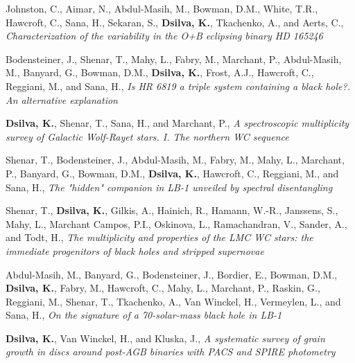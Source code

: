 \begin{enumerate}
Johnston, C., Aimar, N., Abdul-Masih, M., Bowman, D.M., White, T.R., Hawcroft, C., Sana, H., Sekaran, S., \textbf{Dsilva, K.}, Tkachenko, A., and Aerts, C., \textit{Characterization of the variability in the O+B eclipsing binary HD 165246}

Bodensteiner, J., Shenar, T., Mahy, L., Fabry, M., Marchant, P., Abdul-Masih, M., Banyard, G., Bowman, D.M., \textbf{Dsilva, K.}, Frost, A.J., Hawcroft, C., Reggiani, M., and Sana, H., \textit{Is HR 6819 a triple system containing a black hole?. An alternative explanation}

\textbf{Dsilva, K.}, Shenar, T., Sana, H., and Marchant, P., \textit{A spectroscopic multiplicity survey of Galactic Wolf-Rayet stars. I. The northern WC sequence}

Shenar, T., Bodensteiner, J., Abdul-Masih, M., Fabry, M., Mahy, L., Marchant, P., Banyard, G., Bowman, D.M., \textbf{Dsilva, K.}, Hawcroft, C., Reggiani, M., and Sana, H., \textit{The "hidden" companion in LB-1 unveiled by spectral disentangling}

Shenar, T., \textbf{Dsilva, K.}, Gilkis, A., Hainich, R., Hamann, W.-R., Janssens, S., Mahy, L., Marchant Campos, P.I., Oskinova, L., Ramachandran, V., Sander, A., and Todt, H., \textit{The multiplicity and properties of the LMC WC stars: the immediate progenitors of black holes and stripped supernovae}

Abdul-Masih, M., Banyard, G., Bodensteiner, J., Bordier, E., Bowman, D.M., \textbf{Dsilva, K.}, Fabry, M., Hawcroft, C., Mahy, L., Marchant, P., Raskin, G., Reggiani, M., Shenar, T., Tkachenko, A., Van Winckel, H., Vermeylen, L., and Sana, H., \textit{On the signature of a 70-solar-mass black hole in LB-1}

\textbf{Dsilva, K.}, Van Winckel, H., and Kluska, J., \textit{A systematic survey of grain growth in discs around post-AGB binaries with PACS and SPIRE photometry}



\end{enumerate}



\cleardoublepage

